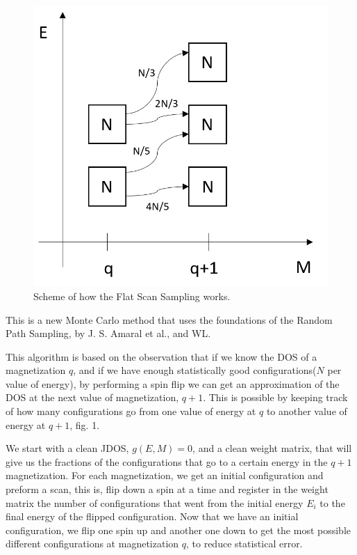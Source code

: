 \documentclass[a4paper, 11pt]{article}
\begin{document}
	\begin{figure}[b]
		\includegraphics[scale=0.26]{scheme_new_rps.png}
		\centering
		\caption{Scheme of how the Flat Scan Sampling works.}
		
	\end{figure}
	
	This is a new Monte Carlo method that uses the foundations of the Random Path Sampling\cite{RPS}, by J. S. Amaral et al., and WL\cite{WL_original}.
	
	This algorithm is based on the observation that if we know the DOS of a magnetization $q$, and if we have enough statistically good configurations($N$ per value of energy), by performing a spin flip we can get an approximation of the DOS at the next value of magnetization, $q+1$. This is possible by keeping track of how many configurations go from one value of energy at $q$ to another value of energy at $q+1$, fig. 1.
	
	We start with a clean JDOS, $g(E, M)=0$, and a clean weight matrix, that will give us the fractions of the configurations that go to a certain energy in the $q+1$ magnetization. For each magnetization, we get an initial configuration and preform a scan, this is, flip down a spin at a time and register in the weight matrix the number of configurations that went from the initial energy $E_i$ to the final energy of the flipped configuration.
	Now that we have an initial configuration, we flip one spin up and another one down to get the most possible different configurations at magnetization $q$, to reduce statistical error. 
	
\end{document}
